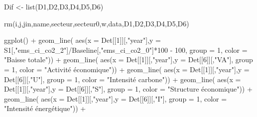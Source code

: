 \documentclass[
]{article}
\newenvironment{Shaded}{\begin{snugshade}}{\end{snugshade}}
\newcommand{\AttributeTok}[1]{\textcolor[rgb]{0.77,0.63,0.00}{#1}}
\newcommand{\DecValTok}[1]{\textcolor[rgb]{0.00,0.00,0.81}{#1}}
\newcommand{\FunctionTok}[1]{\textcolor[rgb]{0.00,0.00,0.00}{#1}}
\newcommand{\NormalTok}[1]{#1}
\newcommand{\OtherTok}[1]{\textcolor[rgb]{0.56,0.35,0.01}{#1}}
\newcommand{\SpecialCharTok}[1]{\textcolor[rgb]{0.00,0.00,0.00}{#1}}
\newcommand{\StringTok}[1]{\textcolor[rgb]{0.31,0.60,0.02}{#1}}
\begin{document}
\begin{Shaded}
\begin{Highlighting}[]
\NormalTok{Dif }\OtherTok{\textless{}{-}} \FunctionTok{list}\NormalTok{(D1,D2,D3,D4,D5,D6)}

\FunctionTok{rm}\NormalTok{(i,j,jin,name,secteur,secteur0,w,data,D1,D2,D3,D4,D5,D6)}
\end{Highlighting}
\end{Shaded}

\begin{Shaded}
\begin{Highlighting}[]
\FunctionTok{ggplot}\NormalTok{() }\SpecialCharTok{+} 
  \FunctionTok{geom\_line}\NormalTok{( }\FunctionTok{aes}\NormalTok{(}\AttributeTok{x =}\NormalTok{ Det[[}\DecValTok{1}\NormalTok{]][,}\StringTok{"year"}\NormalTok{],}\AttributeTok{y =}\NormalTok{ S1[,}\StringTok{"ems\_ci\_co2\_2"}\NormalTok{]}\SpecialCharTok{/}\NormalTok{Baseline[,}\StringTok{"ems\_ci\_co2\_0"}\NormalTok{]}\SpecialCharTok{*}\DecValTok{100} \SpecialCharTok{{-}} \DecValTok{100}\NormalTok{, }\AttributeTok{group =} \DecValTok{1}\NormalTok{, }\AttributeTok{color =} \StringTok{"Baisse totale"}\NormalTok{)) }\SpecialCharTok{+} 
  \FunctionTok{geom\_line}\NormalTok{( }\FunctionTok{aes}\NormalTok{(}\AttributeTok{x =}\NormalTok{ Det[[}\DecValTok{1}\NormalTok{]][,}\StringTok{"year"}\NormalTok{],}\AttributeTok{y =}\NormalTok{ Det[[}\DecValTok{6}\NormalTok{]][,}\StringTok{"VA"}\NormalTok{], }\AttributeTok{group =} \DecValTok{1}\NormalTok{, }\AttributeTok{color =} \StringTok{"Activité économique"}\NormalTok{)) }\SpecialCharTok{+} 
  \FunctionTok{geom\_line}\NormalTok{( }\FunctionTok{aes}\NormalTok{(}\AttributeTok{x =}\NormalTok{ Det[[}\DecValTok{1}\NormalTok{]][,}\StringTok{"year"}\NormalTok{],}\AttributeTok{y =}\NormalTok{ Det[[}\DecValTok{6}\NormalTok{]][,}\StringTok{"U"}\NormalTok{], }\AttributeTok{group =} \DecValTok{1}\NormalTok{, }\AttributeTok{color =} \StringTok{"Intensité carbone"}\NormalTok{)) }\SpecialCharTok{+} 
  \FunctionTok{geom\_line}\NormalTok{( }\FunctionTok{aes}\NormalTok{(}\AttributeTok{x =}\NormalTok{ Det[[}\DecValTok{1}\NormalTok{]][,}\StringTok{"year"}\NormalTok{],}\AttributeTok{y =}\NormalTok{ Det[[}\DecValTok{6}\NormalTok{]][,}\StringTok{"S"}\NormalTok{], }\AttributeTok{group =} \DecValTok{1}\NormalTok{, }\AttributeTok{color =} \StringTok{"Structure économique"}\NormalTok{)) }\SpecialCharTok{+} 
  \FunctionTok{geom\_line}\NormalTok{( }\FunctionTok{aes}\NormalTok{(}\AttributeTok{x =}\NormalTok{ Det[[}\DecValTok{1}\NormalTok{]][,}\StringTok{"year"}\NormalTok{],}\AttributeTok{y =}\NormalTok{ Det[[}\DecValTok{6}\NormalTok{]][,}\StringTok{"I"}\NormalTok{], }\AttributeTok{group =} \DecValTok{1}\NormalTok{, }\AttributeTok{color =} \StringTok{"Intensité énergétique"}\NormalTok{)) }\SpecialCharTok{+} 

\end{Highlighting}
\end{Shaded}
\end{document}
